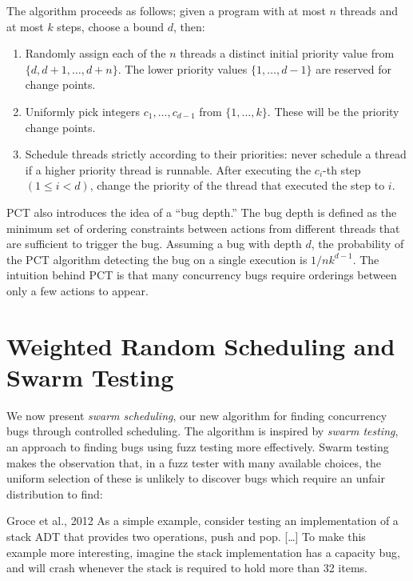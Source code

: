 The algorithm proceeds as follows; given a program with at most $n$
threads and at most $k$ steps, choose a bound $d$, then:

\begin{enumerate}
\item Randomly assign each of the $n$ threads a distinct initial priority value
  from $\{d, d + 1, \ldots, d+n\}$.  The lower priority values
  $\{1, \ldots, d−1\}$ are reserved for change points.
\item Uniformly pick integers $c_1, \ldots, c_{d−1}$ from $\{1, \ldots, k\}$.
  These will be the priority change points.
\item Schedule threads strictly according to their priorities: never schedule a
  thread if a higher priority thread is runnable.  After executing the $c_i$-th
  step $(1 \leq i < d)$, change the priority of the thread that executed the
  step to $i$.
\end{enumerate}

PCT also introduces the idea of a ``bug depth.''  The bug depth is
defined as the minimum set of ordering constraints between actions
from different threads that are sufficient to trigger the
bug\cite{burckhardt2010}.  Assuming a bug with depth $d$, the
probability of the PCT algorithm detecting the bug on a single
execution is $1/nk^{d−1}$.  The intuition behind PCT is that many
concurrency bugs require orderings between only a few actions to
appear.

\section{Weighted Random Scheduling and Swarm Testing}
\label{sec:algorithms-swarm}

We now present \emph{swarm scheduling}, our new algorithm for finding
concurrency bugs through controlled scheduling.  The algorithm is inspired by
\emph{swarm testing}\cite{groce2012}, an approach to finding bugs using fuzz
testing more effectively.  Swarm testing makes the observation that, in a fuzz
tester with many available choices, the uniform selection of these is unlikely
to discover bugs which require an unfair distribution to find:

\begin{bquote}{Groce et al., 2012\nocite{groce2012}}
  As a simple example, consider testing an implementation of a stack ADT that
  provides two operations, push and pop. [\ldots] To make this example more
  interesting, imagine the stack implementation has a capacity bug, and will
  crash whenever the stack is required to hold more than 32
  items.
\end{bquote}

